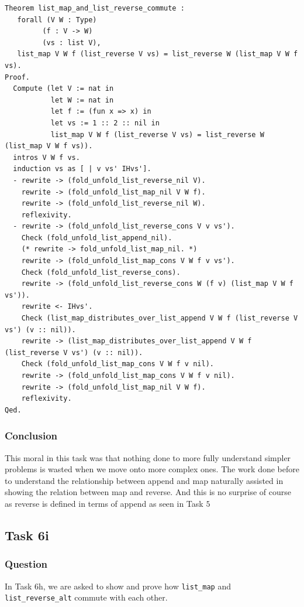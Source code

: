 \documentclass{article}
\begin{document}
\begin{lstlisting}
Theorem list_map_and_list_reverse_commute :
   forall (V W : Type)
         (f : V -> W)
         (vs : list V),
   list_map V W f (list_reverse V vs) = list_reverse W (list_map V W f vs).
Proof.
  Compute (let V := nat in
           let W := nat in
           let f := (fun x => x) in
           let vs := 1 :: 2 :: nil in
           list_map V W f (list_reverse V vs) = list_reverse W (list_map V W f vs)).
  intros V W f vs.
  induction vs as [ | v vs' IHvs'].
  - rewrite -> (fold_unfold_list_reverse_nil V).
    rewrite -> (fold_unfold_list_map_nil V W f).
    rewrite -> (fold_unfold_list_reverse_nil W).
    reflexivity.
  - rewrite -> (fold_unfold_list_reverse_cons V v vs').
    Check (fold_unfold_list_append_nil).
    (* rewrite -> fold_unfold_list_map_nil. *)
    rewrite -> (fold_unfold_list_map_cons V W f v vs'). 
    Check (fold_unfold_list_reverse_cons).
    rewrite -> (fold_unfold_list_reverse_cons W (f v) (list_map V W f vs')).
    rewrite <- IHvs'.
    Check (list_map_distributes_over_list_append V W f (list_reverse V vs') (v :: nil)).
    rewrite -> (list_map_distributes_over_list_append V W f (list_reverse V vs') (v :: nil)).
    Check (fold_unfold_list_map_cons V W f v nil).
    rewrite -> (fold_unfold_list_map_cons V W f v nil).
    rewrite -> (fold_unfold_list_map_nil V W f).
    reflexivity.
Qed.
\end{lstlisting}

\subsubsection{Conclusion}
This moral in this task was that nothing done to more fully understand simpler problems is wasted when we move onto more complex ones. The work done before to understand the relationship between append and map naturally assisted in showing the relation between map and reverse. And this is no surprise of course as reverse is defined in terms of append as seen in Task $5$

\subsection{Task 6i}

\subsubsection{Question}
In Task 6h, we are asked to show and prove how \texttt{list\_map} and \texttt{list\_reverse\_alt} commute with each other.
\end{document}
